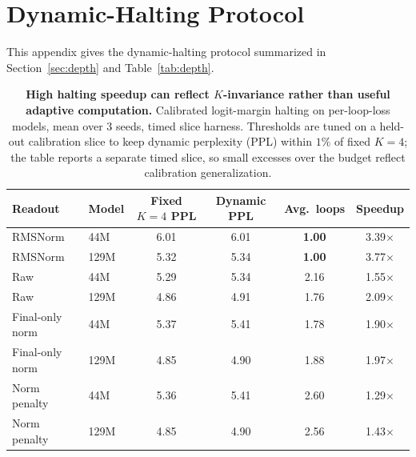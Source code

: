 \section{Dynamic-Halting Protocol}
\label{app:halt-protocol}

This appendix gives the dynamic-halting protocol summarized in Section~\ref{sec:depth} and Table~\ref{tab:depth}.

\begin{table}[h]
\centering
\small
\caption{\textbf{High halting speedup can reflect $K$-invariance rather than useful adaptive computation.} Calibrated logit-margin halting on per-loop-loss models, mean over 3 seeds, timed slice harness. Thresholds are tuned on a held-out calibration slice to keep dynamic perplexity (PPL) within $1\%$ of fixed $K=4$; the table reports a separate timed slice, so small excesses over the budget reflect calibration generalization.}
\label{tab:halting-main}
\begin{tabular}{llcccc}
\toprule
\textbf{Readout} & \textbf{Model} & \textbf{Fixed $K=4$ PPL} & \textbf{Dynamic PPL} & \textbf{Avg.\ loops} & \textbf{Speedup} \\
\midrule
RMSNorm        & 44M  & 6.01 & 6.01 & \textbf{1.00} & 3.39$\times$ \\
RMSNorm        & 129M & 5.32 & 5.34 & \textbf{1.00} & 3.77$\times$ \\
Raw            & 44M  & 5.29 & 5.34 & 2.16 & 1.55$\times$ \\
Raw            & 129M & 4.86 & 4.91 & 1.76 & 2.09$\times$ \\
Final-only norm & 44M  & 5.37 & 5.41 & 1.78 & 1.90$\times$ \\
Final-only norm & 129M & 4.85 & 4.90 & 1.88 & 1.97$\times$ \\
Norm penalty   & 44M  & 5.36 & 5.41 & 2.60 & 1.29$\times$ \\
Norm penalty   & 129M & 4.85 & 4.90 & 2.56 & 1.43$\times$ \\
\bottomrule
\end{tabular}
\end{table}

